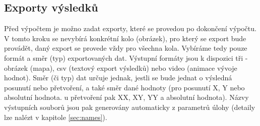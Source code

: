 \documentclass[a4paper,12pt]{article}
\begin{document}
\subsection{Exporty výsledků}
\begin{figure}[H]
\end{figure}
Před výpočtem je možno zadat exporty, které se provedou po dokončení výpočtu. V tomto kroku se nevybírá konkrétní kolo (obrázek), pro který se export bude provádět, daný export se provede vždy pro všechna kola. Vybíráme tedy pouze formát a směr (typ) exportovaných dat. Výstupní formáty jsou k dispozici tři - obrázek (mapa), csv (textový export výsledků) nebo video (animace vývoje hodnot). Směr (či typ) dat určuje jednak, jestli se bude jednat o výsledná posunutí nebo přetvoření, a také směr dané hodnoty (pro posunutí X, Y nebo absolutní hodnota. u přetvoření pak XX, XY, YY a absolutní hodnota). Názvy výstupních souborů jsou pak generovány automaticky z parametrů úlohy (detaily lze nalézt v kapitole \ref{sec:names}).
\end{document}

